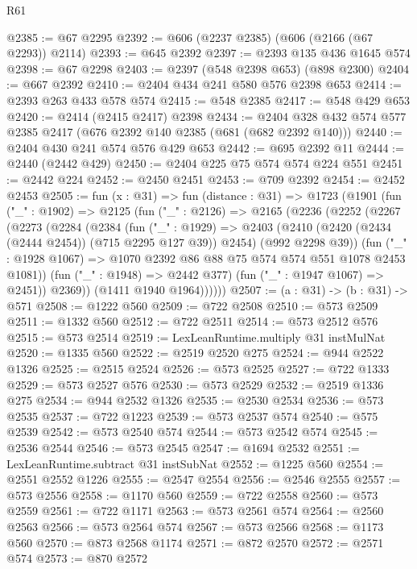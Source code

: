\begin{lexlean}{R61}
\begin{coremodule}
@2385 := @67 @2295
@2392 := @606 (@2237 @2385) (@606 (@2166 (@67 @2293)) @2114)
@2393 := @645 @2392
@2397 := @2393 @135 @436 @1645 @574
@2398 := @67 @2298
@2403 := @2397 (@548 @2398 @653) (@898 @2300)
@2404 := @667 @2392
@2410 := @2404 @434 @241 @580 @576 @2398 @653
@2414 := @2393 @263 @433 @578 @574
@2415 := @548 @2385
@2417 := @548 @429 @653
@2420 := @2414 (@2415 @2417) @2398
@2434 := @2404 @328 @432 @574 @577 @2385 @2417 (@676 @2392 @140 @2385 (@681 (@682 @2392 @140)))
@2440 := @2404 @430 @241 @574 @576 @429 @653
@2442 := @695 @2392 @11
@2444 := @2440 (@2442 @429)
@2450 := @2404 @225 @75 @574 @574 @224 @551
@2451 := @2442 @224
@2452 := @2450 @2451
@2453 := @709 @2392
@2454 := @2452 @2453
@2505 := fun (x : @31) =>
  fun (distance : @31) =>
  @1723
    (@1901
      (fun ("_" : @1902) =>
      @2125
        (fun ("_" : @2126) =>
        @2165
          (@2236
            (@2252
              (@2267
                (@2273
                  (@2284
                    (@2384
                      (fun ("_" : @1929) =>
                      @2403
                        (@2410 (@2420 (@2434 (@2444 @2454)) (@715 @2295 @127 @39)) @2454)
                        (@992 @2298 @39))
                      (fun ("_" : @1928 @1067) =>
                      @1070 @2392 @86 @88 @75 @574 @574 @551 @1078 @2453 @1081))
                    (fun ("_" : @1948) => @2442 @377)
                    (fun ("_" : @1947 @1067) => @2451))
                  @2369))
              (@1411 @1940 @1964))))))
@2507 := (a : @31) -> (b : @31) -> @571
@2508 := @1222 @560
@2509 := @722 @2508
@2510 := @573 @2509
@2511 := @1332 @560
@2512 := @722 @2511
@2514 := @573 @2512 @576
@2515 := @573 @2514
@2519 := LexLeanRuntime.multiply @31 instMulNat
@2520 := @1335 @560
@2522 := @2519 @2520 @275
@2524 := @944 @2522 @1326
@2525 := @2515 @2524
@2526 := @573 @2525
@2527 := @722 @1333
@2529 := @573 @2527 @576
@2530 := @573 @2529
@2532 := @2519 @1336 @275
@2534 := @944 @2532 @1326
@2535 := @2530 @2534
@2536 := @573 @2535
@2537 := @722 @1223
@2539 := @573 @2537 @574
@2540 := @575 @2539
@2542 := @573 @2540 @574
@2544 := @573 @2542 @574
@2545 := @2536 @2544
@2546 := @573 @2545
@2547 := @1694 @2532
@2551 := LexLeanRuntime.subtract @31 instSubNat
@2552 := @1225 @560
@2554 := @2551 @2552 @1226
@2555 := @2547 @2554
@2556 := @2546 @2555
@2557 := @573 @2556
@2558 := @1170 @560
@2559 := @722 @2558
@2560 := @573 @2559
@2561 := @722 @1171
@2563 := @573 @2561 @574
@2564 := @2560 @2563
@2566 := @573 @2564 @574
@2567 := @573 @2566
@2568 := @1173 @560
@2570 := @873 @2568 @1174
@2571 := @872 @2570
@2572 := @2571 @574
@2573 := @870 @2572

\end{coremodule}
\end{lexlean}
